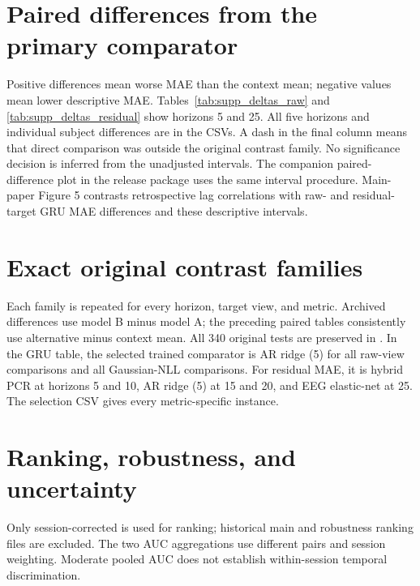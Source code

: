 \documentclass[a4paper,10pt,onecolumn]{IEEEtran}
\begin{document}



\clearpage
\section{Paired differences from the primary comparator}

Positive differences mean worse MAE than the context mean; negative values
mean lower descriptive MAE. Tables~\ref{tab:supp_deltas_raw} and
\ref{tab:supp_deltas_residual} show horizons 5 and 25.
All five horizons and individual subject differences are in the CSVs.
A dash in the final column means that direct comparison was outside the
original contrast family. No significance decision is inferred from the
unadjusted intervals. The companion paired-difference plot in the release
package uses the same interval procedure. Main-paper Figure 5 contrasts
retrospective lag correlations with raw- and residual-target GRU MAE
differences and these descriptive intervals.




\clearpage
\section{Exact original contrast families}

Each family is repeated for every horizon, target view, and metric.
Archived differences use model B minus model A; the preceding paired tables
consistently use alternative minus context mean.
All 340 original tests are preserved in .
In the GRU table, the selected trained comparator is AR ridge (5) for all
raw-view comparisons and all Gaussian-NLL comparisons. For residual MAE,
it is hybrid PCR at horizons 5 and 10, AR ridge (5) at 15 and 20, and EEG
elastic-net at 25. The selection CSV gives every metric-specific instance.




\clearpage
\section{Ranking, robustness, and uncertainty}

Only session-corrected 
is used for ranking; historical main and robustness ranking files are excluded.
The two AUC aggregations use different pairs and session weighting.
Moderate pooled AUC does not establish within-session temporal discrimination.
\end{document}
